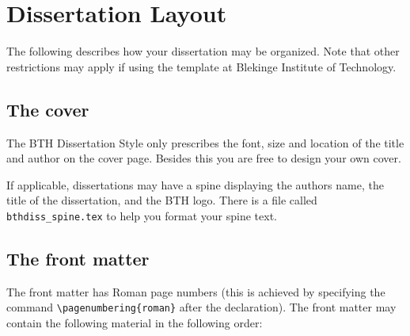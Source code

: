 
\chapter{Dissertation Layout}
The following describes how your dissertation may be organized.
Note that other restrictions may apply if using the template at Blekinge Institute of Technology.

\section{The cover}
The BTH Dissertation Style only prescribes the font, size and location 
of the title and author on the cover page. Besides this you are free to 
design your own cover.

If applicable, dissertations may have a spine displaying the authors name, the title of the dissertation, and the BTH logo.
There is a file called {\tt bthdiss\_spine.tex} to help you format your spine text.

\section{The front matter}
The front matter has Roman page numbers (this is achieved by specifying the command \verb|\pagenumbering{roman}| after the \verb|| declaration).
The front matter may contain the following material in the following order:

